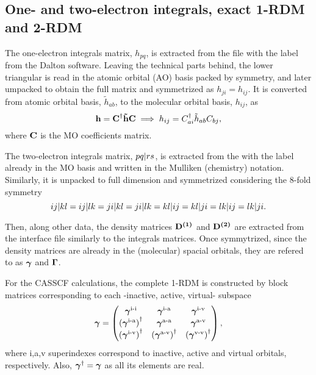 \subsection{One- and two-electron integrals, exact 1-RDM and 2-RDM}

The one-electron integrals matrix, $h_{pq}$, is extracted from the 
 file with the  label from the Dalton
software.
Leaving the technical parts behind, the lower triangular is read in the atomic
orbital (AO) basis packed by symmetry, and later umpacked to
obtain the full matrix and symmetrized as $h_{ji} = h_{ij}$.
It is converted from atomic orbital basis, $\tilde{h}_{ab}$, to the molecular
orbital basis, $h_{ij}$, as 
\begin{equation}
    \boldsymbol{\mathrm{h}} = \boldsymbol{\mathrm{C}}^{\dagger} \boldsymbol{\mathrm{\tilde{h}}} \boldsymbol{\mathrm{C}}
    \implies
    h_{ij} = C_{ai}^{\dagger} \tilde{h}_{ab} C_{bj},
\end{equation}
where $ \boldsymbol{\mathrm{C}}$ is the MO coefficients matrix.

The two-electron integrals matrix, $ \PBraket{pq | rs}$, is extracted from the
 with the  label already in the MO basis and
written in the Mulliken (chemistry) notation.
Similarly, it is unpacked to full dimension and symmetrized considering the
8-fold symmetry
\begin{equation} \label{eq:spac-int-8fold}
    \PBraket{ij | kl} = 
    \PBraket{ij | lk} = 
    \PBraket{ji | kl} = 
    \PBraket{ji | lk} = 
    \PBraket{kl | ij} = 
    \PBraket{kl | ji} = 
    \PBraket{lk | ij} = 
    \PBraket{lk | ji}
    .
\end{equation}

Then, along other data, the density matrices $\boldsymbol{\mathrm{D^{\left( 1 \right)}}}$ and $\boldsymbol{\mathrm{D^{\left( 2 \right)}}}$ are
extracted from the interface  file similarly to the integrals
matrices.
Once symmytrized, since the density matrices are already in the (molecular)
spacial orbitals, they are refered to as $\boldsymbol{\mathrm{\gamma}}$ and $\boldsymbol{\mathrm{\Gamma}}$.

For the CASSCF calculations, the complete 1-RDM is constructed by block matrices
corresponding to each -inactive, active, virtual- subspace
\begin{equation} \label{eq:complete-cas-1rdm-1}
    \boldsymbol{\mathrm{\gamma}} =
    \begin{pmatrix}
        \boldsymbol{\mathrm{\gamma}}^{\text{i-i}} & \boldsymbol{\mathrm{\gamma}}^{\text{i-a}} & \boldsymbol{\mathrm{\gamma}}^{\text{i-v}} \\
        \left( \boldsymbol{\mathrm{\gamma}}^{\text{i-a}} \right)^{\dagger} & \boldsymbol{\mathrm{\gamma}}^{\text{a-a}} & \boldsymbol{\mathrm{\gamma}}^{\text{a-v}} \\
        \left( \boldsymbol{\mathrm{\gamma}}^{\text{i-v}} \right)^{\dagger} & \left( \boldsymbol{\mathrm{\gamma}}^{\text{a-v}} \right)^{\dagger} & \left( \boldsymbol{\mathrm{\gamma}}^{\text{v-v}} \right)^{\dagger} \\
    \end{pmatrix}
    ,
\end{equation}
where i,a,v superindexes correspond to inactive, active and virtual orbitals,
respectively.
Also, $\boldsymbol{\mathrm{\gamma}}^{\dagger} = \boldsymbol{\mathrm{\gamma}}$ as all its elements
are real.

